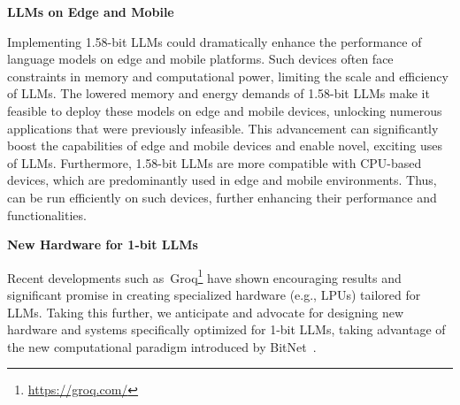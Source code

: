 \textbf{LLMs on Edge and Mobile}

Implementing 1.58-bit LLMs could dramatically enhance the performance of language models on edge and mobile platforms. Such devices often face constraints in memory and computational power, limiting the scale and efficiency of LLMs. The lowered memory and energy demands of 1.58-bit LLMs make it feasible to deploy these models on edge and mobile devices, unlocking numerous applications that were previously infeasible. This advancement can significantly boost the capabilities of edge and mobile devices and enable novel, exciting uses of LLMs. Furthermore, 1.58-bit LLMs are more compatible with CPU-based devices, which are predominantly used in edge and mobile environments. Thus,  can be run efficiently on such devices, further enhancing their performance and functionalities.

\textbf{New Hardware for 1-bit LLMs}

Recent developments such as~Groq\footnote{\url{https://groq.com/}} have shown encouraging results and significant promise in creating specialized hardware (e.g., LPUs) tailored for LLMs. Taking this further, we anticipate and advocate for designing new hardware and systems specifically optimized for 1-bit LLMs, taking advantage of the new computational paradigm introduced by BitNet~\cite{bitnet}.

